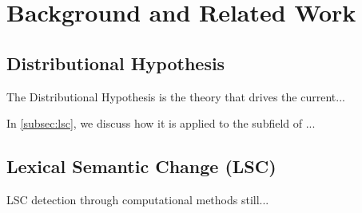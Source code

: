 \section{Background and Related Work}
\label{sec:background}

\subsection{Distributional Hypothesis}

The Distributional Hypothesis is the theory that drives the current... 

In \autoref{subsec:lsc}, we discuss how it is applied to the subfield of ...

\subsection{Lexical Semantic Change (LSC)}
\label{subsec:lsc}

LSC detection through computational methods still...